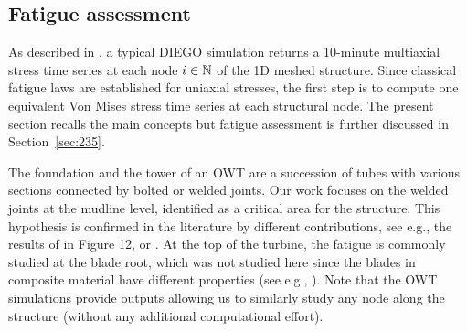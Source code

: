 \subsection{Fatigue assessment}
As described in , a typical DIEGO simulation returns a 10-minute multiaxial stress time series at each node $i \in \mathbb{N}$ of the 1D meshed structure. 
Since classical fatigue laws are established for uniaxial stresses, the first step is to compute one equivalent Von Mises stress time series at each structural node.
The present section recalls the main concepts but fatigue assessment is further discussed in Section~\ref{sec:235}. 

The foundation and the tower of an OWT are a succession of tubes with various sections connected by bolted or welded joints. 
Our work focuses on the welded joints at the mudline level, identified as a critical area for the structure. 
This hypothesis is confirmed in the literature by different contributions, see e.g., the results of \citet{muller_cheng_2018} in Figure 12, or \citet{katsikogiannis_2021_owt_fatigue}. 
At the top of the turbine, the fatigue is commonly studied at the blade root, which was not studied here since the blades in composite material have different properties (see e.g., \cite{dimitrov_2013}). 
Note that the OWT simulations provide outputs allowing us to similarly study any node along the structure (without any additional computational effort).

